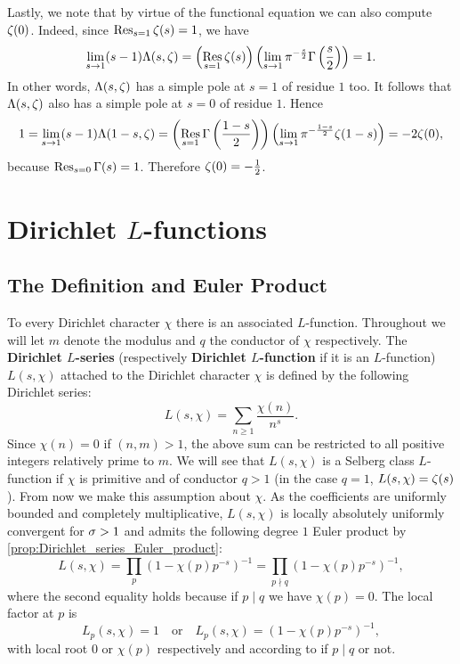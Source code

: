       Lastly, we note that by virtue of the functional equation we can also compute $\zeta(0)$. Indeed, since $\operatorname*{\mathrm{Res}}_{s = 1}\zeta(s) = 1$, we have
      \[
        \lim_{s \to 1}(s-1)\Lambda(s,\zeta) = \left(\operatorname*{\mathrm{Res}}_{s = 1}\zeta(s)\right)\left(\lim_{s \to 1}\pi^{-\frac{s}{2}}\Gamma\left(\frac{s}{2}\right)\right) = 1.
      \]
      In other words, $\Lambda(s,\zeta)$ has a simple pole at $s = 1$ of residue $1$ too. It follows that $\Lambda(s,\zeta)$ also has a simple pole at $s = 0$ of residue $1$. Hence
      \[
        1 = \lim_{s \to 1}(s-1)\Lambda(1-s,\zeta) = \left(\operatorname*{\mathrm{Res}}_{s = 1}\Gamma\left(\frac{1-s}{2}\right)\right)\left(\lim_{s \to 1}\pi^{-\frac{1-s}{2}}\zeta(1-s)\right) = -2\zeta(0),
      \]
      because $\operatorname*{\mathrm{Res}}_{s = 0}\Gamma(s) = 1$. Therefore $\zeta(0) = -\frac{1}{2}$.
  \section{Dirichlet \texorpdfstring{$L$}{L}-functions}
    \subsection*{The Definition and Euler Product}
      To every Dirichlet character $\chi$ there is an associated $L$-function. Throughout we will let $m$ denote the modulus and $q$ the conductor of $\chi$ respectively. The \textbf{Dirichlet $L$-series} (respectively \textbf{Dirichlet $L$-function} if it is an $L$-function) $L(s,\chi)$ attached to the Dirichlet character $\chi$ is defined by the following Dirichlet series:
      \[
        L(s,\chi) = \sum_{n \ge 1}\frac{\chi(n)}{n^{s}}.
      \]
      Since $\chi(n) = 0$ if $(n,m) > 1$, the above sum can be restricted to all positive integers relatively prime to $m$. We will see that $L(s,\chi)$ is a Selberg class $L$-function if $\chi$ is primitive and of conductor $q > 1$ (in the case $q = 1$, $L(s,\chi) = \zeta(s)$). From now we make this assumption about $\chi$. As the coefficients are uniformly bounded and completely multiplicative, $L(s,\chi)$ is locally absolutely uniformly convergent for $\sigma > 1$ and admits the following degree $1$ Euler product by \cref{prop:Dirichlet_series_Euler_product}:
      \[
        L(s,\chi) = \prod_{p}(1-\chi(p)p^{-s})^{-1} = \prod_{p \nmid q}(1-\chi(p)p^{-s})^{-1},
      \]
      where the second equality holds because if $p \mid q$ we have $\chi(p) = 0$. The local factor at $p$ is
      \[
        L_{p}(s,\chi) = 1 \quad \text{or} \quad L_{p}(s,\chi) = (1-\chi(p)p^{-s})^{-1},
      \]
      with local root $0$ or $\chi(p)$ respectively and according to if $p \mid q$ or not.
